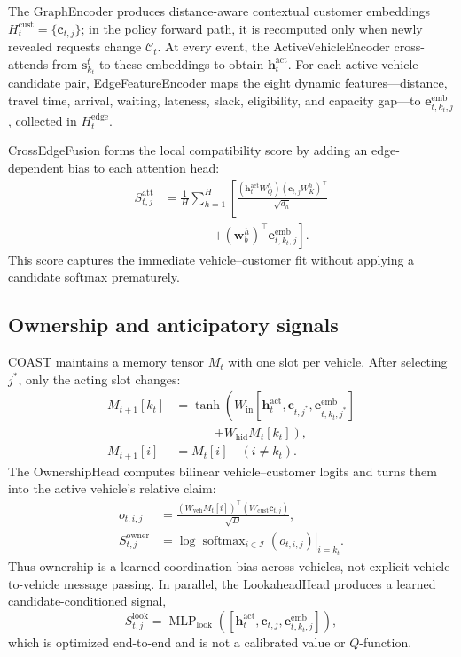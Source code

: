 \documentclass[letterpaper]{article}
\begin{document}
The GraphEncoder produces distance-aware contextual customer embeddings $H_t^{\mathrm{cust}}=\{\mathbf c_{t,j}\}$; in the policy forward path, it is recomputed only when newly revealed requests change $\mathcal C_t$. At every event, the ActiveVehicleEncoder cross-attends from $\mathbf s_{k_t}^t$ to these embeddings to obtain $\mathbf h_t^{\mathrm{act}}$. For each active-vehicle--candidate pair, EdgeFeatureEncoder maps the eight dynamic features---distance, travel time, arrival, waiting, lateness, slack, eligibility, and capacity gap---to $\mathbf e_{t,k_t,j}^{\mathrm{emb}}$, collected in $H_t^{\mathrm{edge}}$.

CrossEdgeFusion forms the local compatibility score by adding an edge-dependent bias to each attention head:
\[
\begin{aligned}
S_{t,j}^{\mathrm{att}}
&=\frac{1}{H}\sum_{h=1}^{H}\left[
\frac{(\mathbf h_t^{\mathrm{act}}W_Q^h)(\mathbf c_{t,j}W_K^h)^\top}{\sqrt{d_h}}\right.\\[-2pt]
&\hspace{48pt}\left.+(\mathbf w_b^h)^\top\mathbf e_{t,k_t,j}^{\mathrm{emb}}\right].
\end{aligned}
\]
This score captures the immediate vehicle--customer fit without applying a candidate softmax prematurely.

\subsection{Ownership and anticipatory signals}

COAST maintains a memory tensor $M_t$ with one slot per vehicle. After selecting $j^*$, only the acting slot changes:
\[
\begin{aligned}
M_{t+1}[k_t]&=\tanh\!\left(W_{\mathrm{in}}[\mathbf h_t^{\mathrm{act}},\mathbf c_{t,j^*},
\mathbf e_{t,k_t,j^*}^{\mathrm{emb}}]\right.\\[-2pt]
&\hspace{38pt}\left.+W_{\mathrm{hid}}M_t[k_t]\right),\\
M_{t+1}[i]&=M_t[i]\quad(i\ne k_t).
\end{aligned}
\]
The OwnershipHead computes bilinear vehicle--customer logits and turns them into the active vehicle's relative claim:
\[
\begin{aligned}
o_{t,i,j}&=\frac{(W_{\mathrm{veh}}M_t[i])^\top(W_{\mathrm{cust}}\mathbf c_{t,j})}{\sqrt D},\\
S_{t,j}^{\mathrm{owner}}&=
\left.\log\operatorname{softmax}_{i\in\mathcal I}(o_{t,i,j})\right|_{i=k_t}.
\end{aligned}
\]
Thus ownership is a learned coordination bias across vehicles, not explicit vehicle-to-vehicle message passing. In parallel, the LookaheadHead produces a learned candidate-conditioned signal,
\[
S_{t,j}^{\mathrm{look}}=\operatorname{MLP}_{\mathrm{look}}
([\mathbf h_t^{\mathrm{act}},\mathbf c_{t,j},\mathbf e_{t,k_t,j}^{\mathrm{emb}}]),
\]
which is optimized end-to-end and is not a calibrated value or $Q$-function.
\end{document}

